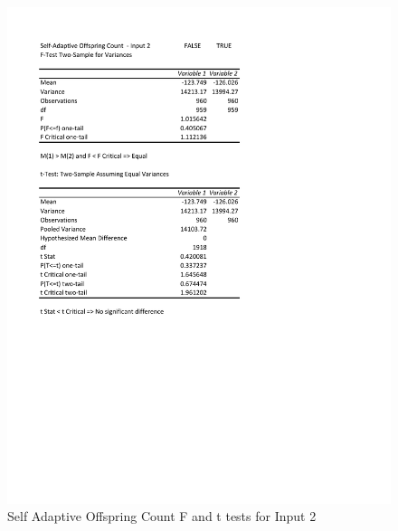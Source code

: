 \documentclass[times]{article}
\begin{document}
	\begin{figure}
		\caption{Self Adaptive Offspring Count F and t tests for Input 2}
		\label{fig:saOffspring2}
		\includegraphics[width=\textwidth]{./t_test/S-AOffspringCount2}
	\end{figure}
\end{document}

